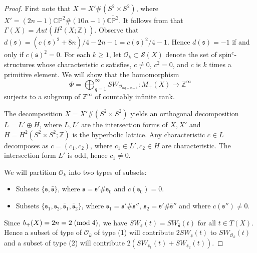 \documentclass{amsart}
\theoremstyle{definition}
\theoremstyle{remark}
\numberwithin{equation}{section}
\begin{document}
\begin{proof}
First note that $X = X' \# (S^2 \times S^2)$, where $X' = (2n-1)\mathbb{CP}^2 \# (10n-1)\overline{\mathbb{CP}^2}$. It follows from \cite{wall} that $\Gamma(X) = Aut( H^2(X ; \mathbb{Z} ) )$. Observe that $d(\mathfrak{s}) = (c(\mathfrak{s})^2 + 8n)/4 - 2n - 1 = c(\mathfrak{s})^2/4 - 1$. Hence $d(\mathfrak{s}) = -1$ if and only if $c(\mathfrak{s})^2 = 0$. For each $k \ge 1$, let $\mathcal{O}_k \subset \mathcal{S}(X)$ denote the set of spin$^c$-structures whose characteristic $c$ satisfies, $c \neq 0$, $c^2 = 0$, and $c$ is $k$ times a primitive element. We will show that the homomorphism
\[
\Phi = \bigoplus_{q=1}^{\infty} SW_{\mathcal{O}_{nq-q-1}} : M_+(X) \to \mathbb{Z}^{\infty}
\]
surjects to a subgroup of $\mathbb{Z}^{\infty}$ of countably infinite rank. 

The decomposition $X = X' \# (S^2 \times S^2)$ yields an orthogonal decomposition $L = L' \oplus H$, where $L,L'$ are the intersection forms of $X,X'$ and $H = H^2(S^2 \times S^2 ; \mathbb{Z})$ is the hyperbolic lattice. Any characteristic $c \in L$ decomposes as $c = (c_1 , c_2)$, where $c_1 \in L', c_2 \in H$ are characteristic. The intersection form $L'$ is odd, hence $c_1 \neq 0$.

We will partition $\mathcal{O}_k$ into two types of subsets:
\begin{itemize}
\item[(1)]{Subsets $\{ \mathfrak{s} , \bar{\mathfrak{s}} \}$, where $\mathfrak{s} = \mathfrak{s}' \# \mathfrak{s}_0$ and $c(\mathfrak{s}_0) = 0$.}
\item[(2)]{Subsets $\{ \mathfrak{s}_1 , \mathfrak{s}_2 , \bar{\mathfrak{s}}_1 , \bar{\mathfrak{s}}_2 \}$, where $\mathfrak{s}_1 = \mathfrak{s}' \# \mathfrak{s}''$, $\mathfrak{s}_2 = \mathfrak{s}' \# \bar{\mathfrak{s}}''$ and where $c(\mathfrak{s}'') \neq 0$.}
\end{itemize}

Since $b_+(X) = 2n = 2 \; ({\rm mod} \; 4)$, we have $SW_{\mathfrak{s}}(t) = SW_{\bar{\mathfrak{s}}}(t)$ for all $t \in T(X)$. Hence a subset of type of $\mathcal{O}_k$ of type (1) will contribute $2 SW_{\mathfrak{s}}(t)$ to $SW_{\mathcal{O}_k}(t)$ and a subset of type (2) will contribute $2 ( SW_{\mathfrak{s}_1}(t) + SW_{\mathfrak{s}_2}(t) )$.


\end{proof}
\end{document}
